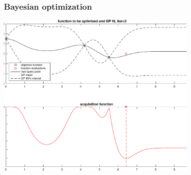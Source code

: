 \documentclass[10pt,handout]{beamer}
\begin{document}
\begin{frame}

\frametitle{Bayesian optimization}

    \includegraphics[width=10cm]{figs/bayesopt_1d_regular_iter3-crop.pdf}

\end{frame}
\end{document}
